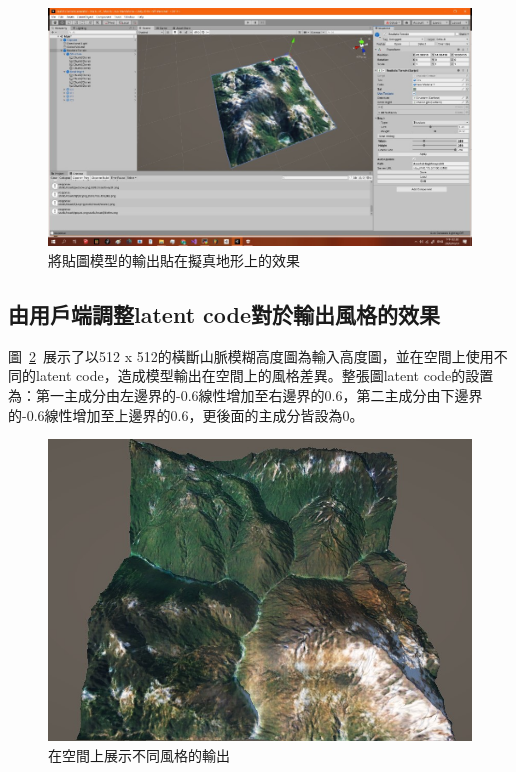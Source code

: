 \documentclass[a4paper, 12pt]{article}
\begin{document}
\begin{figure}[htbp]
    \centering
    \includegraphics[width=0.8\linewidth]{fig/17.jpg}
    \caption{將貼圖模型的輸出貼在擬真地形上的效果}
    \label{fig:17}
\end{figure}

\subsection{由用戶端調整latent code對於輸出風格的效果}
圖~\ref{fig:18}~展示了以512 x 512的橫斷山脈模糊高度圖為輸入高度圖，並在空間上使用不同的latent code，造成模型輸出在空間上的風格差異。整張圖latent code的設置為：第一主成分由左邊界的-0.6線性增加至右邊界的0.6，第二主成分由下邊界的-0.6線性增加至上邊界的0.6，更後面的主成分皆設為0。

\begin{figure}[htbp]
    \centering
    \includegraphics[width=0.5\linewidth]{fig/18.jpg}
    \caption{在空間上展示不同風格的輸出}
    \label{fig:18}
\end{figure}
\end{document}
